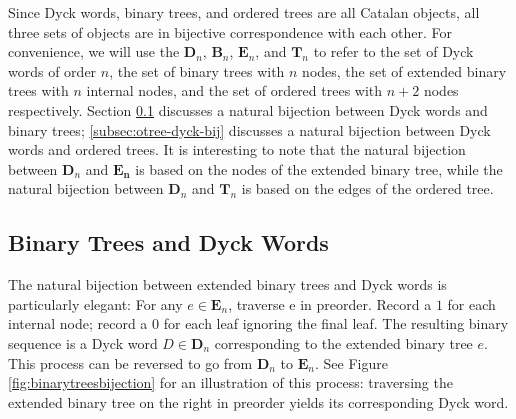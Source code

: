 Since Dyck words, binary trees, and ordered trees are all Catalan objects, all three sets of objects are in bijective correspondence with each other.  For convenience, we will use the $\mathbf{D}_n$, $\mathbf{B}_n$, $\mathbf{E}_n$, and $\mathbf{T}_n$ to refer to the set of Dyck words of order $n$, the set of binary trees with $n$ nodes, the set of extended binary trees with $n$ internal nodes, and the set of ordered trees with $n+2$ nodes respectively.  Section \ref{subsec:bintree-dyck-bij} discusses a natural bijection between Dyck words and binary trees; \ref{subsec:otree-dyck-bij} discusses a natural bijection between Dyck words and ordered trees.  It is interesting to note that the natural bijection between $\mathbf{D}_n$ and $\mathbf{E_n}$ is based on the nodes of the extended binary tree, while the natural bijection between $\mathbf{D}_n$ and $\mathbf{T}_n$ is based on the edges of the ordered tree.

\subsection{Binary Trees and Dyck Words} \label{subsec:bintree-dyck-bij}

The natural bijection between extended binary trees and Dyck words is particularly elegant: 
For any $e \in \mathbf{E}_n$, traverse e in preorder.  Record a $1$ for each internal node; record a $0$ for each leaf ignoring the final leaf. The resulting binary sequence is a Dyck word  $D \in \mathbf{D}_n $ corresponding to the extended binary tree $e$.  This process can be reversed to go from $\mathbf{D}_n$ to $\mathbf{E}_n$.  See Figure \ref{fig:binarytreesbijection} for an illustration of this process: traversing the extended binary tree on the right in preorder yields its corresponding Dyck word.

